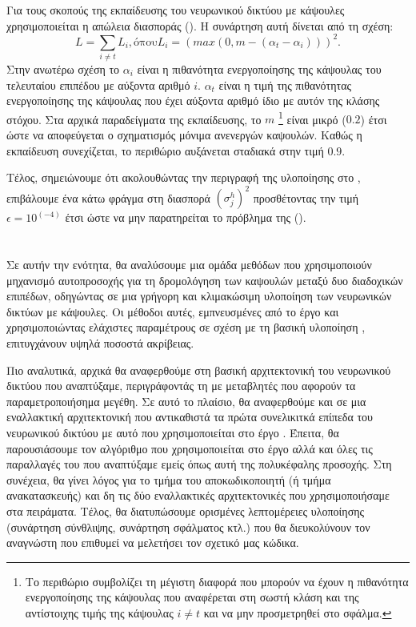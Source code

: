 Για τους σκοπούς της εκπαίδευσης του νευρωνικού δικτύου με κάψουλες χρησιμοποιείται η απώλεια διασποράς (). Η συνάρτηση αυτή δίνεται από τη σχέση:
\begin{equation}
  L = \sum_{i\neq t} L_i, \text{όπου} L_i = (max(0, m - (\alpha_t - \alpha_i)))^2.
\end{equation}
Στην ανωτέρω σχέση το $\alpha_i$ είναι η πιθανότητα ενεργοποίησης της κάψουλας του τελευταίου επιπέδου με αύξοντα αριθμό $i$. $\alpha_t$ είναι η τιμή της πιθανότητας ενεργοποίησης της κάψουλας που έχει αύξοντα αριθμό ίδιο με αυτόν της κλάσης στόχου. Στα αρχικά παραδείγματα της εκπαίδευσης, το  $m$ \footnote{Το περιθώριο συμβολίζει τη μέγιστη διαφορά που μπορούν να έχουν η πιθανότητα ενεργοποίησης της κάψουλας που αναφέρεται στη σωστή κλάση και της αντίστοιχης τιμής της κάψουλας $i \neq t$ και να μην προσμετρηθεί στο σφάλμα.} είναι μικρό ($0.2$) έτσι ώστε να αποφεύγεται ο σχηματισμός μόνιμα ανενεργών καψουλών. Καθώς η εκπαίδευση συνεχίζεται, το περιθώριο αυξάνεται σταδιακά στην τιμή $0.9$.\par

Τέλος, σημειώνουμε ότι ακολουθώντας την περιγραφή της υλοποίησης στο \cite{gritzman2019avoiding}, επιβάλουμε ένα κάτω φράγμα στη διασπορά $(\sigma_j^h)^2$ προσθέτοντας την τιμή $\epsilon = 10^(-4)$ έτσι ώστε να μην παρατηρείται το πρόβλημα της  ().


\section{}

Σε αυτήν την ενότητα, θα αναλύσουμε μια ομάδα μεθόδων που χρησιμοποιούν μηχανισμό αυτο\textendash προσοχής για τη δρομολόγηση των καψουλών μεταξύ δυο διαδοχικών επιπέδων, οδηγώντας σε μια γρήγορη και κλιμακώσιμη υλοποίηση των νευρωνικών δικτύων με κάψουλες. Οι μέθοδοι αυτές, εμπνευσμένες από το έργο \cite{mazzia2021efficient} και χρησιμοποιώντας ελάχιστες παραμέτρους σε σχέση με τη βασική υλοποίηση \cite{sabour2017dynamic}, επιτυγχάνουν υψηλά ποσοστά ακρίβειας. \par

Πιο αναλυτικά, αρχικά θα αναφερθούμε στη βασική αρχιτεκτονική του νευρωνικού δικτύου που αναπτύξαμε, περιγράφοντάς τη με μεταβλητές που αφορούν τα παραμετροποιήσημα μεγέθη. Σε αυτό το πλαίσιο, θα αναφερθούμε και σε μια εναλλακτική αρχιτεκτονική που αντικαθιστά τα πρώτα συνελικιτκά επίπεδα του νευρωνικού δικτύου με αυτό που χρησιμοποιείται στο έργο \cite{sabour2017dynamic}. Έπειτα, θα παρουσιάσουμε τον αλγόριθμο που χρησιμοποιείται στο έργο \cite{mazzia2021efficient} αλλά και όλες τις παραλλαγές του που αναπτύξαμε εμείς όπως αυτή της πολυκέφαλης προσοχής. Στη συνέχεια, θα γίνει λόγος για το τμήμα του αποκωδικοποιητή (ή τμήμα ανακατασκευής) και δη τις δύο εναλλακτικές αρχιτεκτονικές που χρησιμοποιήσαμε στα πειράματα. Τέλος, θα διατυπώσουμε ορισμένες λεπτομέρειες υλοποίησης (συνάρτηση σύνθλιψης, συνάρτηση σφάλματος κτλ.) που θα διευκολύνουν τον αναγνώστη που επιθυμεί να μελετήσει τον σχετικό μας κώδικα.\par

